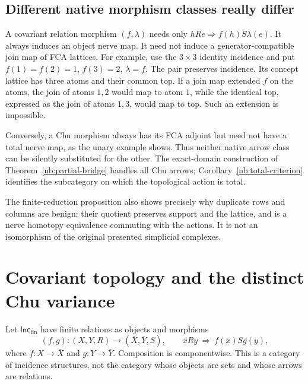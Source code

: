 \documentclass[11pt]{article}
\theoremstyle{remark}
\begin{document}
\subsection{Different native morphism classes really differ}

A covariant relation morphism $(f,\lambda)$ needs only
$hRe\Rightarrow f(h)S\lambda(e)$. It always induces an object nerve map.
It need not induce a generator-compatible join map of FCA lattices.
For example, use the $3\times3$ identity incidence and put
$f(1)=f(2)=1$, $f(3)=2$, $\lambda=f$. The pair preserves incidence.
Its concept lattice has three atoms and their common top. If a join map
extended $f$ on the atoms, the join of atoms $1,2$ would map to atom $1$,
while the identical top, expressed as the join of atoms $1,3$, would map
to top. Such an extension is impossible.

Conversely, a Chu morphism always has its FCA adjoint but need not have
a total nerve map, as the unary example shows. Thus neither native arrow
class can be silently substituted for the other. The exact-domain
construction of Theorem~\ref{nb:partial-bridge} handles all Chu arrows;
Corollary~\ref{nb:total-criterion} identifies the subcategory on which the
topological action is total.

The finite-reduction proposition also shows precisely why duplicate rows
and columns are benign: their quotient preserves support and the lattice,
and is a nerve homotopy equivalence commuting with the actions. It is
not an isomorphism of the original presented simplicial complexes.

\section{Covariant topology and the distinct Chu variance}

Let $\mathsf{Inc}_{\mathrm{fin}}$ have finite relations as objects and
morphisms
\[
 (f,g):(X,Y,R)\longrightarrow(\bar X,\bar Y,S),\qquad
 xRy\ \Longrightarrow\ f(x)Sg(y),
\]
where $f:X\to\bar X$ and $g:Y\to\bar Y$. Composition is componentwise.
This is a category of incidence structures, not the category whose objects
are sets and whose arrows are relations.
\end{document}

